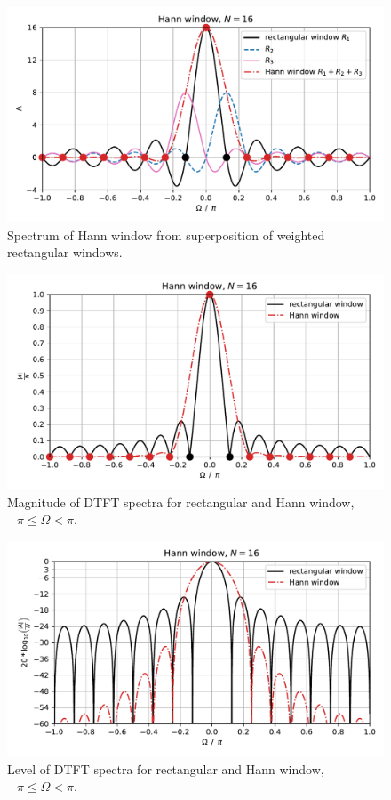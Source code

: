 \documentclass[11pt,a4paper,DIV=12]{scrartcl}
\begin{document}
\begin{figure}
		\centering
		\includegraphics[]{graphics/Hann_from_RectWindow.pdf}
		\caption{Spectrum of Hann window from superposition of weighted rectangular windows.}
		\label{HanningausRectWindow}
\end{figure}
\begin{figure}
		\centering
		\includegraphics[]{graphics/DTFTHannWin_lin.pdf}
		\caption{Magnitude of DTFT spectra for rectangular and Hann window, $-\pi\leq\Omega<\pi$.}
		\label{DTFTHanningWin_lin}
\end{figure}
\begin{figure}
		\centering
		\includegraphics[]{graphics/DTFTHannWin_log.pdf}
		\caption{Level of DTFT spectra for rectangular and Hann window, $-\pi\leq\Omega<\pi$.}
		\label{DTFTHanningWin_log}
\end{figure}
\end{document}
